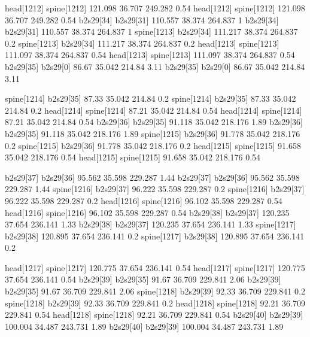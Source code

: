 head[1212]    spine[1212]    121.098    36.707    249.282    0.54
head[1212]    spine[1212]    121.098    36.707    249.282    0.54
b2s29[34]    b2s29[31]    110.557    38.374    264.837    1
b2s29[34]    b2s29[31]    110.557    38.374    264.837    1
spine[1213]    b2s29[34]    111.217    38.374    264.837    0.2
spine[1213]    b2s29[34]    111.217    38.374    264.837    0.2
head[1213]    spine[1213]    111.097    38.374    264.837    0.54
head[1213]    spine[1213]    111.097    38.374    264.837    0.54
b2s29[35]    b2s29[0]    86.67    35.042    214.84    3.11
b2s29[35]    b2s29[0]    86.67    35.042    214.84    3.11


spine[1214]    b2s29[35]    87.33    35.042    214.84    0.2
spine[1214]    b2s29[35]    87.33    35.042    214.84    0.2
head[1214]    spine[1214]    87.21    35.042    214.84    0.54
head[1214]    spine[1214]    87.21    35.042    214.84    0.54
b2s29[36]    b2s29[35]    91.118    35.042    218.176    1.89
b2s29[36]    b2s29[35]    91.118    35.042    218.176    1.89
spine[1215]    b2s29[36]    91.778    35.042    218.176    0.2
spine[1215]    b2s29[36]    91.778    35.042    218.176    0.2
head[1215]    spine[1215]    91.658    35.042    218.176    0.54
head[1215]    spine[1215]    91.658    35.042    218.176    0.54


b2s29[37]    b2s29[36]    95.562    35.598    229.287    1.44
b2s29[37]    b2s29[36]    95.562    35.598    229.287    1.44
spine[1216]    b2s29[37]    96.222    35.598    229.287    0.2
spine[1216]    b2s29[37]    96.222    35.598    229.287    0.2
head[1216]    spine[1216]    96.102    35.598    229.287    0.54
head[1216]    spine[1216]    96.102    35.598    229.287    0.54
b2s29[38]    b2s29[37]    120.235    37.654    236.141    1.33
b2s29[38]    b2s29[37]    120.235    37.654    236.141    1.33
spine[1217]    b2s29[38]    120.895    37.654    236.141    0.2
spine[1217]    b2s29[38]    120.895    37.654    236.141    0.2


head[1217]    spine[1217]    120.775    37.654    236.141    0.54
head[1217]    spine[1217]    120.775    37.654    236.141    0.54
b2s29[39]    b2s29[35]    91.67    36.709    229.841    2.06
b2s29[39]    b2s29[35]    91.67    36.709    229.841    2.06
spine[1218]    b2s29[39]    92.33    36.709    229.841    0.2
spine[1218]    b2s29[39]    92.33    36.709    229.841    0.2
head[1218]    spine[1218]    92.21    36.709    229.841    0.54
head[1218]    spine[1218]    92.21    36.709    229.841    0.54
b2s29[40]    b2s29[39]    100.004    34.487    243.731    1.89
b2s29[40]    b2s29[39]    100.004    34.487    243.731    1.89


